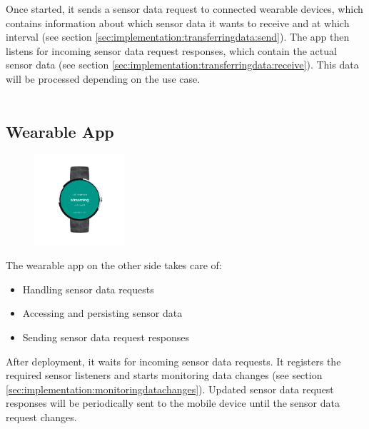 Once started, it sends a sensor data request to connected wearable devices, which contains information about which sensor data it wants to receive and at which interval (see section \ref{sec:implementation:transferringdata:send}).
The app then listens for incoming sensor data request responses, which contain the actual sensor data (see section \ref{sec:implementation:transferringdata:receive}).
This data will be processed depending on the use case.
\\\\
\subsection{Wearable App}
\label{sec:concept:wearableapp}
\begin{figure}
	\begin{center}
		\includegraphics[width=0.3\textwidth]{images/app/watch.png}
	\end{center}
\end{figure}
The wearable app on the other side takes care of:
\begin{itemize}[noitemsep]
	\item Handling sensor data requests
	\item Accessing and persisting sensor data
	\item Sending sensor data request responses
\end{itemize}

After deployment, it waits for incoming sensor data requests.
It registers the required sensor listeners and starts monitoring data changes (see section \ref{sec:implementation:monitoringdatachanges}).
Updated sensor data request responses will be periodically sent to the mobile device until the sensor data request changes.

\clearpage